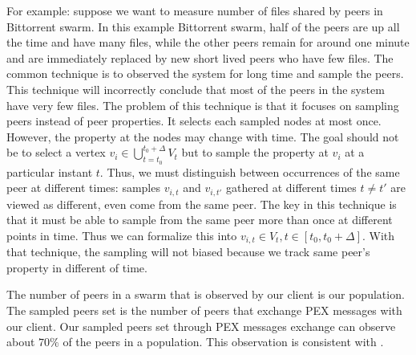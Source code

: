 \documentclass[paper]{ieice}
\begin{document}
For example: suppose we want to measure number of files shared by peers in Bittorrent swarm.
In this example Bittorrent swarm, half of the peers are up all the time and have many files, while the other peers remain for around one minute and are immediately replaced by new short lived peers who have few files.
The common technique is to observed the system for long time and sample the peers. 
This technique will incorrectly conclude that most of the peers in the system have very few files.
The problem of this technique is that it focuses on sampling peers instead of peer properties.
It selects each sampled nodes at most once.
However, the property at the nodes may change with time.  
The goal should not be to select a vertex $v_i \in \bigcup^{t_0+\Delta}_{t=t_0} V_t$ but to sample the property at $v_i$ at a particular instant $t$.
Thus, we must distinguish between occurrences of the same peer at different times: samples $v_{i,t}$ and $v_{i,t'}$ gathered at different times $t \neq t'$ are viewed as different, even come from the same peer.
The key in this technique is that it must be able to sample from the same peer more than once at different points in time.
Thus we can formalize this into $v_{i,t} \in V_t  , t \in [t_0, t_0 + \Delta]$.
With that technique, the sampling will not biased because we track same peer's property in different of time. 

The number of peers in a swarm that is observed by our client is our population. 
The sampled peers set is the number of peers that exchange PEX messages with our client.
Our sampled peers set through PEX messages exchange can observe about $70\%$ of the peers in a population.
This observation is consistent with \cite{wu2010understanding}.
\end{document}
